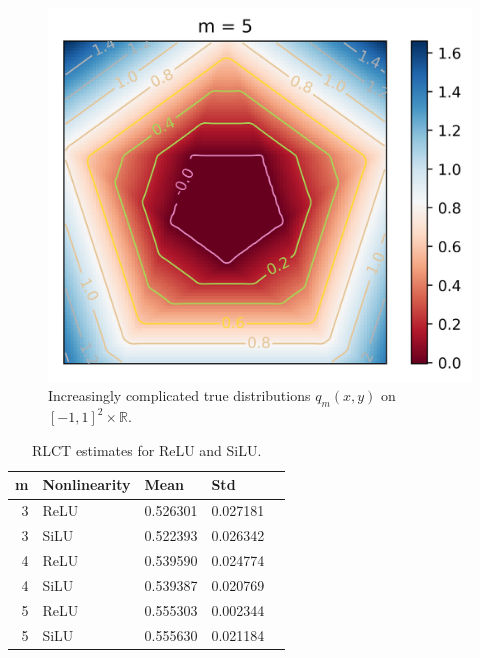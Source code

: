 \documentclass{article} %
\begin{document}
\begin{figure}[h]
\begin{center}
\includegraphics[scale=0.4]{truedist5.png}
\end{center}
\caption{Increasingly complicated true distributions $q_m(x,y)$ on $[-1,1]^2 \times \mathbb{R}$.}
\label{figure:simp_func_complex}
\end{figure}

\begin{table}[h]
    \begin{center}
    \begin{tabular}
    {r l l l l}
    \toprule
      \textbf{m}  & \textbf{Nonlinearity}  & \textbf{Mean} & \textbf{Std}\\ 
    \midrule
    3 & ReLU & 0.526301 & 0.027181\\
    3 & SiLU & 0.522393 & 0.026342\\
    4 & ReLU & 0.539590 & 0.024774\\
    4 & SiLU & 0.539387 & 0.020769\\
    5 & ReLU & 0.555303 & 0.002344\\
    5 & SiLU & 0.555630 & 0.021184\\
   \bottomrule
   \end{tabular}
    \end{center}
    \caption{\footnotesize RLCT estimates for ReLU and SiLU.}
    \label{table:hyper}
\end{table}
\end{document}
